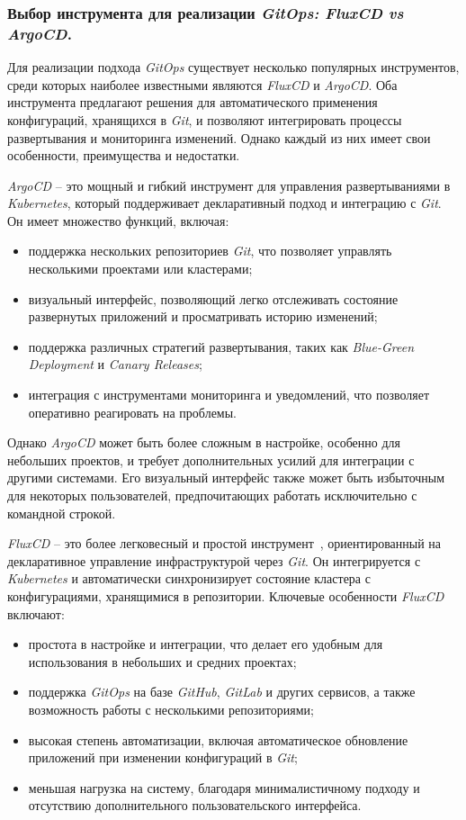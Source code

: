 \subsubsection{Выбор инструмента для реализации \textit{GitOps: FluxCD vs ArgoCD}.}
Для реализации подхода \textit{GitOps} существует несколько популярных инструментов, среди которых наиболее известными являются \textit{FluxCD} и \textit{ArgoCD}. Оба инструмента предлагают решения для автоматического применения конфигураций, хранящихся в \textit{Git}, и позволяют интегрировать процессы развертывания и мониторинга изменений. Однако каждый из них имеет свои особенности, преимущества и недостатки.


\textit{ArgoCD} -- это мощный и гибкий инструмент для управления развертываниями в \textit{Kubernetes}, который поддерживает декларативный подход и интеграцию с \textit{Git}. Он имеет множество функций, включая:

\begin{itemize}
    \item поддержка нескольких репозиториев \textit{Git}, что позволяет управлять несколькими проектами или кластерами; 
    \item визуальный интерфейс, позволяющий легко отслеживать состояние развернутых приложений и просматривать историю изменений; 
    \item поддержка различных стратегий развертывания, таких как \textit{Blue-Green Deployment} и \textit{Canary Releases}; 
    \item интеграция с инструментами мониторинга и уведомлений, что позволяет оперативно реагировать на проблемы. 
\end{itemize}

Однако \textit{ArgoCD} может быть более сложным в настройке, особенно для небольших проектов, и требует дополнительных усилий для интеграции с другими системами. Его визуальный интерфейс также может быть избыточным для некоторых пользователей, предпочитающих работать исключительно с командной строкой.


\textit{FluxCD} -- это более легковесный и простой инструмент~\cite{fluxcd}, ориентированный на декларативное управление инфраструктурой через \textit{Git}. Он интегрируется с \textit{Kubernetes} и автоматически синхронизирует состояние кластера с конфигурациями, хранящимися в репозитории. Ключевые особенности \textit{FluxCD} включают:

\begin{itemize}
    \item простота в настройке и интеграции, что делает его удобным для использования в небольших и средних проектах; 
    \item поддержка \textit{GitOps} на базе \textit{GitHub}, \textit{GitLab} и других сервисов, а также возможность работы с несколькими репозиториями; 
    \item высокая степень автоматизации, включая автоматическое обновление приложений при изменении конфигураций в \textit{Git}; 
    \item меньшая нагрузка на систему, благодаря минималистичному подходу и отсутствию дополнительного пользовательского интерфейса. 
\end{itemize}

